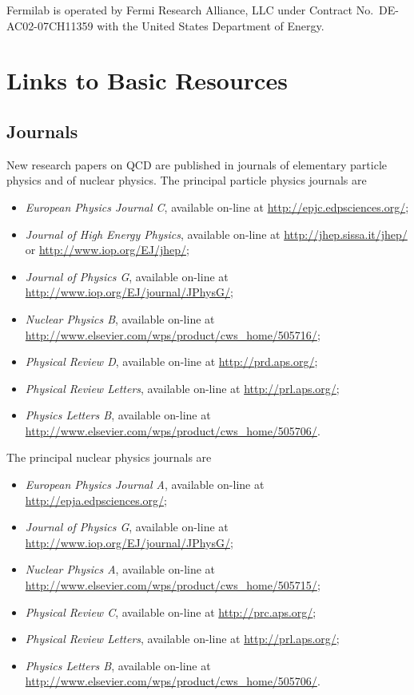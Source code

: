 \documentclass[11pt,prb,groupedaddress,nofootinbib,showpacs,floatfix]{revtex4-1}
\begin{document}
Fermilab is operated by Fermi Research Alliance, LLC  under Contract
No.~DE-AC02-07CH11359 with the United States Department of Energy.  

\appendix

\section{Links to Basic Resources}
\label{app:links}

\subsection{Journals}
New research papers on QCD are published in journals of elementary 
particle physics and of nuclear physics.
The principal particle physics journals are
\begin{itemize}
	\item \emph{European Physics Journal C}, available on-line at 
	\url{http://epjc.edpsciences.org/};
	\item \emph{Journal of High Energy Physics}, available on-line at 
	\url{http://jhep.sissa.it/jhep/} or 
	\url{http://www.iop.org/EJ/jhep/};
	\item \emph{Journal of Physics G}, available on-line at 
	\url{http://www.iop.org/EJ/journal/JPhysG/};
	\item \emph{Nuclear Physics B}, available on-line at 
	\url{http://www.elsevier.com/wps/product/cws_home/505716/};
	\item \emph{Physical Review D}, available on-line at 
	\url{http://prd.aps.org/};
	\item \emph{Physical Review Letters}, available on-line at 
	\url{http://prl.aps.org/};
	\item \emph{Physics Letters B}, available on-line at 
	\url{http://www.elsevier.com/wps/product/cws_home/505706/}.
\end{itemize}
The principal nuclear physics journals are
\begin{itemize}
	\item \emph{European Physics Journal A}, available on-line at 
	\url{http://epja.edpsciences.org/};
	\item \emph{Journal of Physics G}, available on-line at 
	\url{http://www.iop.org/EJ/journal/JPhysG/};
	\item \emph{Nuclear Physics A}, available on-line at 
	\url{http://www.elsevier.com/wps/product/cws_home/505715/};
	\item \emph{Physical Review C}, available on-line at 
	\url{http://prc.aps.org/};
	\item \emph{Physical Review Letters}, available on-line at 
	\url{http://prl.aps.org/};
	\item \emph{Physics Letters B}, available on-line at 
	\url{http://www.elsevier.com/wps/product/cws_home/505706/}.
\end{itemize}
\end{document}
